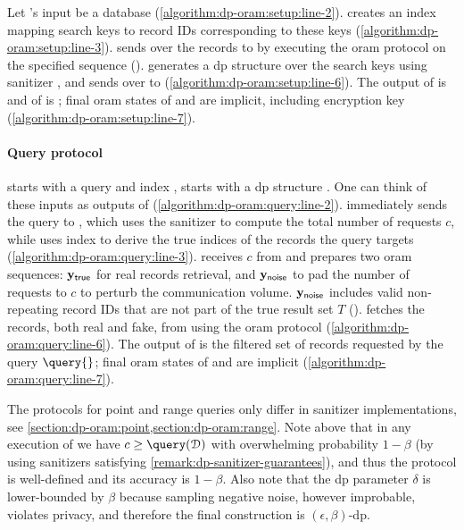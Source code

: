 			Let \user{}'s input be a database \databaseDef{} (\cref{algorithm:dp-oram:setup:line-2}).
			\user{} creates an index \indexI{} mapping search keys to record IDs corresponding to these keys (\cref{algorithm:dp-oram:setup:line-3}).
			\user{} sends over the records to \server{} by executing the \acrshort{oram} protocol on the specified sequence ().
			\user{} generates a \acrshort{dp} structure \serverDS{} over the search keys using sanitizer , and sends \serverDS{} over to \server{} (\cref{algorithm:dp-oram:setup:line-6}).
			The output of \user{} is \indexI{} and of \server{} is \serverDS{}; final \acrshort{oram} states of \server{} and \user{} are implicit, including encryption key \queryKey{} (\cref{algorithm:dp-oram:setup:line-7}).

		\paragraph*{Query protocol \; \texorpdfstring{\protocolQuery{}}{}}

			\user{} starts with a query \query{} and index \indexI{}, \server{} starts with a \acrshort{dp} structure \serverDS{}.
			One can think of these inputs as outputs of \protocolSetup{} (\cref{algorithm:dp-oram:query:line-2}).
			\user{} immediately sends the query to \server{}, which uses the sanitizer  to compute the total number of requests $c$, while \user{} uses index \indexI{} to derive the true indices of the records the query \query{} targets (\cref{algorithm:dp-oram:query:line-3}).
			\user{} receives $c$ from \server{} and prepares two \acrshort{oram} sequences: $\mathbf{y}_\mathsf{true}$ for real records retrieval, and $\mathbf{y}_\mathsf{noise}$ to pad the number of requests to $c$ to perturb the communication volume.
			$\mathbf{y}_\mathsf{noise}$ includes valid non-repeating record IDs that are not part of the true result set $T$ ().
			\user{} fetches the records, both real and fake, from \server{} using the \acrshort{oram} protocol (\cref{algorithm:dp-oram:query:line-6}).
			The output of \user{} is the filtered set of records requested by the query $\query{}$; final \acrshort{oram} states of \server{} and \user{} are implicit (\cref{algorithm:dp-oram:query:line-7}).

		The protocols for point and range queries only differ in sanitizer implementations, see \cref{section:dp-oram:point,section:dp-oram:range}.
		Note above that in any execution of \protocolQuery{} we have $c \geq \query(\database)$ with overwhelming probability $1 - \beta$ (by using sanitizers satisfying \cref{remark:dp-sanitizer-guarantees}), and thus the protocol is well-defined and its accuracy is $1 - \beta$.
		Also note that the \acrshort{dp} parameter $\delta$ is lower-bounded by $\beta$ because sampling negative noise, however improbable, violates privacy, and therefore the final construction is $(\epsilon, \beta)$-\acrshort{dp}.

